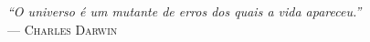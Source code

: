 {\sffamily\itshape
``O universo é um mutante de erros dos quais a vida apareceu.''\\}
--- \textsc{Charles Darwin}
